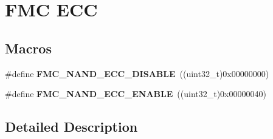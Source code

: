 \hypertarget{group___f_m_c___e_c_c}{}\section{F\+MC E\+CC}
\label{group___f_m_c___e_c_c}
\subsection*{Macros}
\begin{DoxyCompactItemize}
\item 
\#define {\bfseries F\+M\+C\+\_\+\+N\+A\+N\+D\+\_\+\+E\+C\+C\+\_\+\+D\+I\+S\+A\+B\+LE}~((uint32\+\_\+t)0x00000000)\hypertarget{group___f_m_c___e_c_c_gaca6a47995e466cc4c4cf35fd6e3ded15}{}\label{group___f_m_c___e_c_c_gaca6a47995e466cc4c4cf35fd6e3ded15}

\item 
\#define {\bfseries F\+M\+C\+\_\+\+N\+A\+N\+D\+\_\+\+E\+C\+C\+\_\+\+E\+N\+A\+B\+LE}~((uint32\+\_\+t)0x00000040)\hypertarget{group___f_m_c___e_c_c_gae9dfe41aa7796772271738ee8f21bdf8}{}\label{group___f_m_c___e_c_c_gae9dfe41aa7796772271738ee8f21bdf8}

\end{DoxyCompactItemize}


\subsection{Detailed Description}
